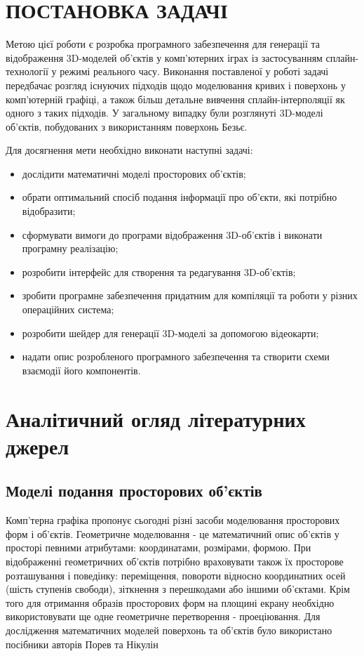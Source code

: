 \let\mypdfximage\pdfximage\def\pdfximage{\immediate\mypdfximage}\documentclass[14pt,a4paper]{extarticle}
\theoremstyle{definition}
\renewcommand{\[}{\begin{singlespace}\begin{equation*}}
\renewcommand{\]}{\end{equation*}\end{singlespace}}
\renewcommand{\+}{\discretionary{\mbox{\scriptsize$\hookleftarrow$}}{}{}}
\begin{document}
\section*{ПОСТАНОВКА ЗАДАЧІ}

Метою цієї роботи є розробка програмного забезпечення для генерації та відображення 3D-моделей об'єктів у комп'ютерних іграх із застосуванням  сплайн-технології у режимі реального часу. Виконання поставленої у роботі задачі передбачає розгляд існуючих підходів щодо моделювання кривих і поверхонь у комп'ютерній графіці, а також більш детальне вивчення сплайн-інтерполяції як одного з таких підходів. У загальному випадку були розглянуті 3D-моделі об'єктів, побудованих з використанням поверхонь Безьє.

Для досягнення мети необхідно виконати наступні задачі:

\begin{itemize}
\item дослідити математичні моделі просторових об'єктів;
\item обрати оптимальний спосіб подання інформації про об'єкти, які потрібно відобразити;
\item сформувати вимоги до програми відображення 3D-об'єктів і виконати програмну реалізацію;
\item розробити інтерфейс для створення та редагування 3D-об'єктів;
\item зробити програмне забезпечення придатним для компіляції та роботи у різних операційних система;
\item розробити шейдер для генерації 3D-моделі за допомогою відеокарти;
\item надати опис розробленого програмного забезпечення та створити схеми взаємодії його компонентів.
\end{itemize}

\section{Аналітичний огляд літературних джерел}

\subsection{Моделі подання просторових об'єктів}

Комп'терна графіка пропонує сьогодні різні засоби моделювання просторових форм і об'єктів. Геометричне моделювання - це математичний опис об'єктів у просторі певними атрибутами: координатами, розмірами, формою. При відображенні геометричних об'єктів потрібно враховувати також їх просторове розташування і поведінку: переміщення, повороти відносно координатних осей (шість ступенів свободи), зіткнення з перешкодами або іншими об'єктами. Крім того для отримання образів просторових форм на площині екрану необхідно використовувати ще одне геометричне перетворення - проеціювання. Для дослідження математичних моделей поверхонь та об'єктів було використано посібники авторів Порев \cite{porev} та Нікулін \cite{nikulin}
\end{document}
